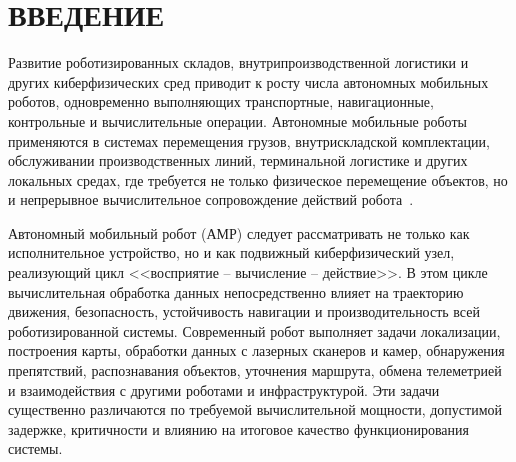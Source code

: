 \chapter*{ВВЕДЕНИЕ}                         %

\newcommand{\actuality}{{\textbf\actualityTXT}}
\newcommand{\progress}{{\textbf\progressTXT}}
\newcommand{\aim}{{\textbf\aimTXT}}
\newcommand{\tasks}{\textbf{\tasksTXT}}
\newcommand{\novelty}{\textbf{\noveltyTXT}}
\newcommand{\influence}{\textbf{\influenceTXT}}
\newcommand{\methods}{\textbf{\methodsTXT}}
\newcommand{\defpositions}{\textbf{\defpositionsTXT}}
\newcommand{\reliability}{\textbf{\reliabilityTXT}}
\newcommand{\probation}{\textbf{\probationTXT}}
\newcommand{\contribution}{\textbf{\contributionTXT}}
\newcommand{\publications}{\textbf{\publicationsTXT}}

Развитие роботизированных складов, внутрипроизводственной логистики и других киберфизических сред приводит к росту числа автономных мобильных роботов, одновременно выполняющих транспортные, навигационные, контрольные и вычислительные операции. Автономные мобильные роботы применяются в системах перемещения грузов, внутрискладской комплектации, обслуживании производственных линий, терминальной логистике и других локальных средах, где требуется не только физическое перемещение объектов, но и непрерывное вычислительное сопровождение действий робота~\cite{Lackner2024AMRIntralogistics,Fragapane2024AMRMaterialHandling,Fragapane2021AMRPlanning}.

Автономный мобильный робот (АМР) следует рассматривать не только как исполнительное устройство, но и как подвижный киберфизический узел, реализующий цикл <<восприятие -- вычисление -- действие>>. В этом цикле вычислительная обработка данных непосредственно влияет на траекторию движения, безопасность, устойчивость навигации и производительность всей роботизированной системы. Современный робот выполняет задачи локализации, построения карты, обработки данных с лазерных сканеров и камер, обнаружения препятствий, распознавания объектов, уточнения маршрута, обмена телеметрией и взаимодействия с другими роботами и инфраструктурой. Эти задачи существенно различаются по требуемой вычислительной мощности, допустимой задержке, критичности и влиянию на итоговое качество функционирования системы.

